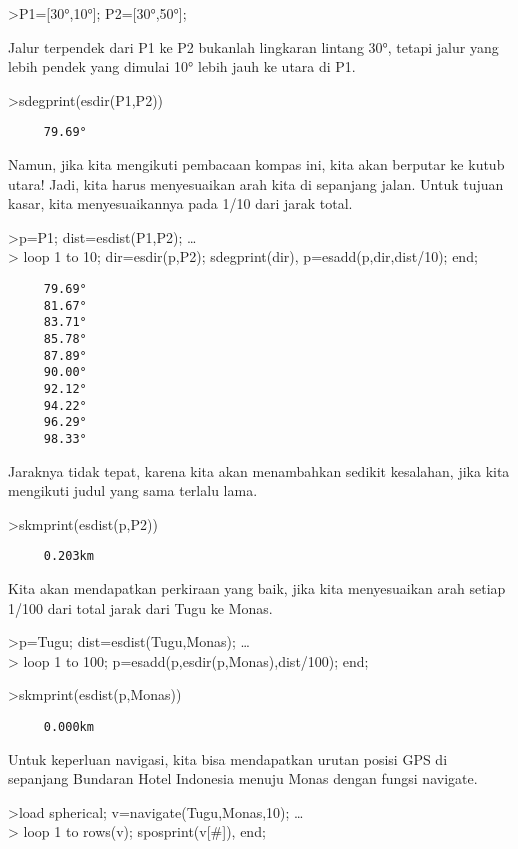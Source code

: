 \documentclass[
]{book}
\begin{document}
\textgreater P1={[}30°,10°{]}; P2={[}30°,50°{]};

Jalur terpendek dari P1 ke P2 bukanlah lingkaran lintang 30°, tetapi jalur yang lebih pendek yang dimulai 10° lebih jauh ke utara di P1.

\textgreater sdegprint(esdir(P1,P2))

\begin{verbatim}
     79.69°
\end{verbatim}

Namun, jika kita mengikuti pembacaan kompas ini, kita akan berputar ke kutub utara! Jadi, kita harus menyesuaikan arah kita di sepanjang jalan. Untuk tujuan kasar, kita menyesuaikannya pada 1/10 dari jarak total.

\textgreater p=P1; dist=esdist(P1,P2); \ldots{}\\
\textgreater{} loop 1 to 10; dir=esdir(p,P2); sdegprint(dir), p=esadd(p,dir,dist/10); end;

\begin{verbatim}
     79.69°
     81.67°
     83.71°
     85.78°
     87.89°
     90.00°
     92.12°
     94.22°
     96.29°
     98.33°
\end{verbatim}

Jaraknya tidak tepat, karena kita akan menambahkan sedikit kesalahan, jika kita mengikuti judul yang sama terlalu lama.

\textgreater skmprint(esdist(p,P2))

\begin{verbatim}
     0.203km
\end{verbatim}

Kita akan mendapatkan perkiraan yang baik, jika kita menyesuaikan arah setiap 1/100 dari total jarak dari Tugu ke Monas.

\textgreater p=Tugu; dist=esdist(Tugu,Monas); \ldots{}\\
\textgreater{} loop 1 to 100; p=esadd(p,esdir(p,Monas),dist/100); end;

\textgreater skmprint(esdist(p,Monas))

\begin{verbatim}
     0.000km
\end{verbatim}

Untuk keperluan navigasi, kita bisa mendapatkan urutan posisi GPS di sepanjang Bundaran Hotel Indonesia menuju Monas dengan fungsi navigate.

\textgreater load spherical; v=navigate(Tugu,Monas,10); \ldots{}\\
\textgreater{} loop 1 to rows(v); sposprint(v{[}\#{]}), end;
\end{document}
